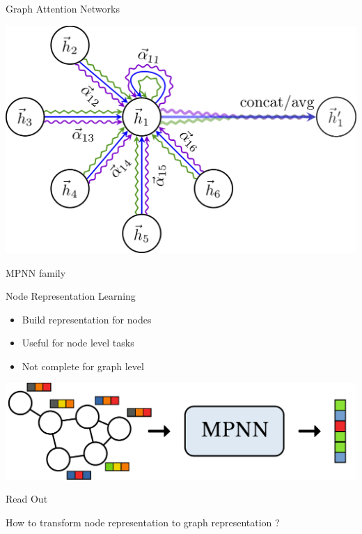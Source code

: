 \documentclass[11pt]{beamer}
\begin{document}
\begin{frame}{Graph Attention Networks}
  \begin{center}
    \includegraphics[width=\textwidth]{gat_velik}
  \end{center}

  
\end{frame}

\begin{frame}{MPNN family}
  \begin{block}{Node Representation Learning}
    \begin{itemize}
    \item Build representation for nodes
    \item Useful for node level tasks
    \item Not complete for graph level
    \end{itemize}
    \begin{center}
      \includegraphics[width=\textwidth]{node_level}
    \end{center}
  \end{block}
\end{frame}


\begin{frame}{Read Out}
  \begin{center}
    \Huge{ How to transform node representation to graph representation ?}
  \end{center}
\end{frame}
\end{document}
